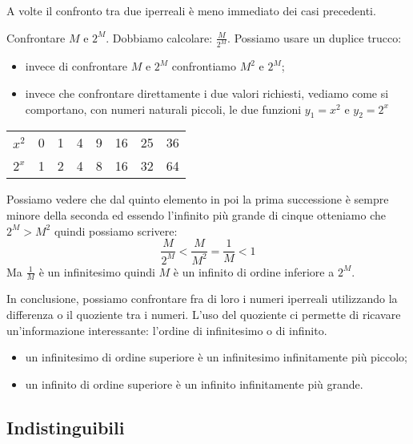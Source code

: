 \vspace{1em}
A volte il confronto tra due iperreali è meno immediato dei casi precedenti.
\begin{esempio}
 Confrontare \(M\) e \(2^M\). 
 Dobbiamo calcolare: \(\frac{M}{2^M}\). 
Possiamo usare un duplice trucco: 
\begin{itemize} [nosep]
 \item invece di confrontare \(M\) e \(2^M\) confrontiamo \(M^2\) e \(2^M\);
 \item invece che confrontare direttamente i due valori richiesti, vediamo 
come si comportano, con numeri naturali piccoli, le due funzioni 
\(y_1=x^2\) e \(y_2=2^x\)
\end{itemize}
\begin{center}
\begin{tabular}{cccccccc}
\(x^2\) & 0 & 1 & 4 & 9 & 16 & 25 & 36\\
\(2^x\) & 1 & 2 & 4 & 8 & 16 & 32 & 64
\end{tabular}
\end{center}
Possiamo vedere che dal quinto elemento in poi la prima successione è sempre
minore della seconda ed essendo l'infinito più grande di cinque 
otteniamo che \(2^M > M^2\) quindi possiamo scrivere:
\[\frac{M}{2^M} < \frac{M}{M^2} = \frac{1}{M} < 1\]
Ma \(\frac{1}{M}\) è un infinitesimo quindi \(M\) è un infinito di ordine 
inferiore a \(2^M\).
\end{esempio}

In conclusione, possiamo confrontare fra di loro i numeri iperreali 
utilizzando la differenza o il quoziente tra i numeri. L'uso del quoziente 
ci permette di ricavare un'informazione interessante: l'ordine di 
infinitesimo o di infinito.
\begin{itemize} [noitemsep]
 \item un infinitesimo di ordine superiore è un infinitesimo infinitamente 
 più piccolo;
 \item un infinito di ordine superiore è un infinito infinitamente più 
grande.
\end{itemize}

\subsection{Indistinguibili}
\label{subsec:insnum_indistinguibili}

